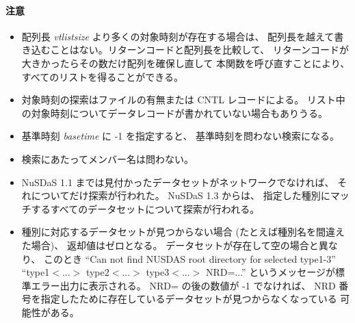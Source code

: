 \paragraph{注意}
\begin{itemize}
\item 配列長 {\it vtlistsize} より多くの対象時刻が存在する場合は、
配列長を越えて書き込むことはない。リターンコードと配列長を比較して、
リターンコードが大きかったらその数だけ配列を確保し直して
本関数を呼び直すことにより、すべてのリストを得ることができる。
\item 対象時刻の探索はファイルの有無または CNTL レコードによる。
リスト中の対象時刻についてデータレコードが書かれていない場合もありうる。
\item 基準時刻 {\it basetime} に -1 を指定すると、
基準時刻を問わない検索になる。
\item 検索にあたってメンバー名は問わない。
\item 
NuSDaS 1.1 までは見付かったデータセットがネットワークでなければ、
それについてだけ探索が行われた。
NuSDaS 1.3 からは、
指定した種別にマッチするすべてのデータセットについて探索が行われる。
\item 
種別に対応するデータセットが見つからない場合
(たとえば種別名を間違えた場合)、
返却値はゼロとなる。
データセットが存在して空の場合と異なり、
このとき ``Can not find NUSDAS root directory for selected type1-3''
``type1$<$...$>$ type2$<$...$>$ type3$<$...$>$ NRD=...''
というメッセージが標準エラー出力に表示される。
NRD= の後の数値が -1 でなければ、
NRD 番号を指定したために存在しているデータセットが見つからなくなっている
可能性がある。
\end{itemize}
